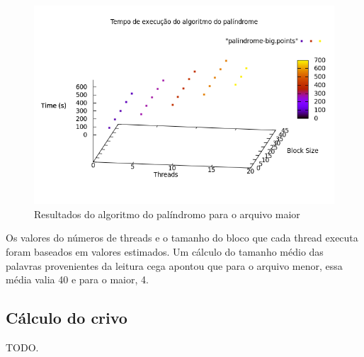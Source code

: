 \documentclass[a4paper]{article}
\begin{document}
\begin{figure}
	\includegraphics[scale=0.5]{palindrome-big}
	\caption{Resultados do algoritmo do palíndromo para o arquivo maior}
	\label{palindrome-big}
\end{figure}
\indent Os valores do números de threads e o tamanho do bloco que cada thread executa foram baseados em valores estimados. Um cálculo do tamanho médio das palavras provenientes da leitura cega apontou que para o arquivo menor, essa média valia 40 e para o maior, 4.

\subsection{Cálculo do crivo}
\indent \indent TODO.
\end{document}
